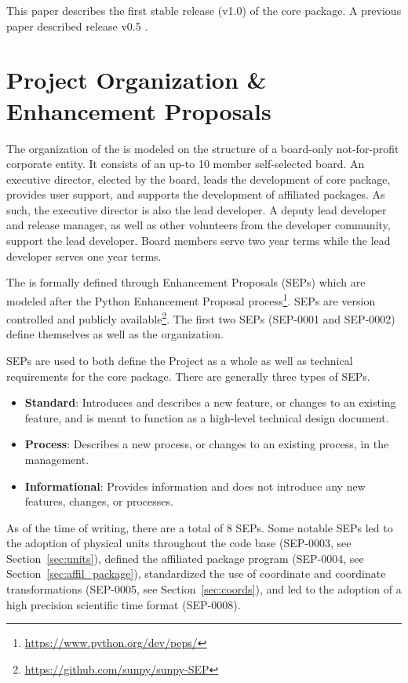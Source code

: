 This paper describes the first stable release (v1.0) of the core package. A previous paper described release v0.5 \citep{Community:2015cy}.

\section{Project Organization \& Enhancement Proposals}

The organization of the \sunpyproj is modeled on the structure of a board-only not-for-profit corporate entity. 
It consists of an up-to 10 member self-selected board. 
An executive director, elected by the board, leads the development of \sunpy core package, provides user support, and supports the development of affiliated packages. 
As such, the executive director is also the \sunpy lead developer.
A deputy lead developer and release manager, as well as other volunteers from the developer community, support the lead developer.
Board members serve two year terms while the lead developer serves one year terms. 

The \sunpyproj is formally defined through \sunpy Enhancement Proposals (SEPs) which are modeled after the Python Enhancement Proposal process\footnote{\url{https://www.python.org/dev/peps/}}.
SEPs are version controlled and publicly available\footnote{\url{https://github.com/sunpy/sunpy-SEP}}. The first two SEPs (SEP-0001 and SEP-0002) define themselves as well as the \sunpy organization. 

SEPs are used to both define the Project as a whole as well as technical requirements for the \sunpypkg core package. 
There are generally three types of SEPs. 
\begin{itemize}
    \item \textbf{Standard}: Introduces and describes a new feature, or changes to an existing feature, and is meant to function as a high-level technical design document.
    \item \textbf{Process}: Describes a new process, or changes to an existing process, in the \sunpyproj management.
    \item \textbf{Informational}: Provides information and does not introduce any new features, changes, or processes.
\end{itemize}

As of the time of writing, there are a total of 8 SEPs. 
Some notable SEPs led to the adoption of physical units throughout the code base (SEP-0003, see Section~\ref{sec:units}), defined the affiliated package program (SEP-0004, see Section~\ref{sec:affil_package}), standardized the use of coordinate and coordinate transformations (SEP-0005, see Section~\ref{sec:coords}), and led to the adoption of a high precision scientific time format (SEP-0008).

